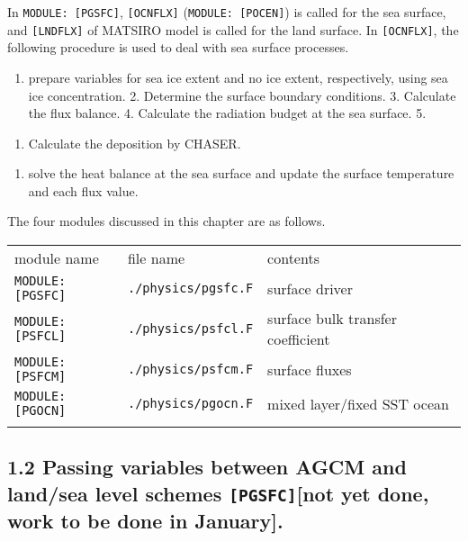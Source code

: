 In \texttt{MODULE:\ {[}PGSFC{]}}, \texttt{{[}OCNFLX{]}}
(\texttt{MODULE:\ {[}POCEN{]}}) is called for the sea surface, and
\texttt{{[}LNDFLX{]}} of MATSIRO model is called for the land surface.
In \texttt{{[}OCNFLX{]}}, the following procedure is used to deal with
sea surface processes.

\begin{enumerate}
\def\labelenumi{\arabic{enumi}.}
\tightlist
\item
  prepare variables for sea ice extent and no ice extent, respectively,
  using sea ice concentration. 2. Determine the surface boundary
  conditions. 3. Calculate the flux balance. 4. Calculate the radiation
  budget at the sea surface. 5.
\end{enumerate}

\begin{enumerate}
\def\labelenumi{(\arabic{enumi})}
\setcounter{enumi}{2}
\tightlist
\item
  Calculate the deposition by CHASER.
\end{enumerate}

\begin{enumerate}
\def\labelenumi{\arabic{enumi}.}
\setcounter{enumi}{5}
\tightlist
\item
  solve the heat balance at the sea surface and update the surface
  temperature and each flux value.
\end{enumerate}

The four modules discussed in this chapter are as follows.

\setlength\LTleft{0pt}\setlength\LTright{0pt}\begin{longtable}[]{@{}lll@{}}
\toprule\relax
module name & file name & contents \\ \addlinespace
\midrule\relax
\endhead
\texttt{MODULE:{[}PGSFC{]}} & \texttt{./physics/pgsfc.F} & surface
driver \\ \addlinespace
\texttt{MODULE:{[}PSFCL{]}} & \texttt{./physics/psfcl.F} & surface bulk
transfer coefficient \\ \addlinespace
\texttt{MODULE:{[}PSFCM{]}} & \texttt{./physics/psfcm.F} & surface
fluxes \\ \addlinespace
\texttt{MODULE:{[}PGOCN{]}} & \texttt{./physics/pgocn.F} & mixed
layer/fixed SST ocean \\ \addlinespace
\bottomrule
\end{longtable}

\hypertarget{passing-variables-between-agcm-and-landsea-level-schemes-pgsfcnot-yet-done-work-to-be-done-in-january.}{%
\subsection{\texorpdfstring{1.2 Passing variables between AGCM and
land/sea level schemes \texttt{{[}PGSFC{]}}{[}not yet done, work to be
done in
January{]}.}{1.2 Passing variables between AGCM and land/sea level schemes {[}PGSFC{]}{[}not yet done, work to be done in January{]}.}}\label{passing-variables-between-agcm-and-landsea-level-schemes-pgsfcnot-yet-done-work-to-be-done-in-january.}}

